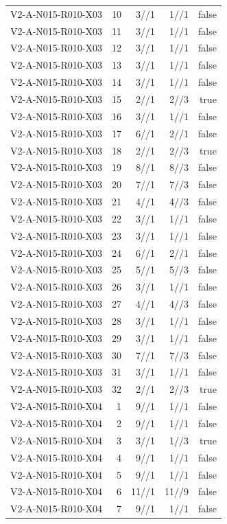 {\begin{longtable}{lrrrr}
V2-A-N015-R010-X03 & 10 & 3//1 & 1//1 & false \\
V2-A-N015-R010-X03 & 11 & 3//1 & 1//1 & false \\
V2-A-N015-R010-X03 & 12 & 3//1 & 1//1 & false \\
V2-A-N015-R010-X03 & 13 & 3//1 & 1//1 & false \\
V2-A-N015-R010-X03 & 14 & 3//1 & 1//1 & false \\
V2-A-N015-R010-X03 & 15 & 2//1 & 2//3 & true \\
V2-A-N015-R010-X03 & 16 & 3//1 & 1//1 & false \\
V2-A-N015-R010-X03 & 17 & 6//1 & 2//1 & false \\
V2-A-N015-R010-X03 & 18 & 2//1 & 2//3 & true \\
V2-A-N015-R010-X03 & 19 & 8//1 & 8//3 & false \\
V2-A-N015-R010-X03 & 20 & 7//1 & 7//3 & false \\
V2-A-N015-R010-X03 & 21 & 4//1 & 4//3 & false \\
V2-A-N015-R010-X03 & 22 & 3//1 & 1//1 & false \\
V2-A-N015-R010-X03 & 23 & 3//1 & 1//1 & false \\
V2-A-N015-R010-X03 & 24 & 6//1 & 2//1 & false \\
V2-A-N015-R010-X03 & 25 & 5//1 & 5//3 & false \\
V2-A-N015-R010-X03 & 26 & 3//1 & 1//1 & false \\
V2-A-N015-R010-X03 & 27 & 4//1 & 4//3 & false \\
V2-A-N015-R010-X03 & 28 & 3//1 & 1//1 & false \\
V2-A-N015-R010-X03 & 29 & 3//1 & 1//1 & false \\
V2-A-N015-R010-X03 & 30 & 7//1 & 7//3 & false \\
V2-A-N015-R010-X03 & 31 & 3//1 & 1//1 & false \\
V2-A-N015-R010-X03 & 32 & 2//1 & 2//3 & true \\
V2-A-N015-R010-X04 & 1 & 9//1 & 1//1 & false \\
V2-A-N015-R010-X04 & 2 & 9//1 & 1//1 & false \\
V2-A-N015-R010-X04 & 3 & 3//1 & 1//3 & true \\
V2-A-N015-R010-X04 & 4 & 9//1 & 1//1 & false \\
V2-A-N015-R010-X04 & 5 & 9//1 & 1//1 & false \\
V2-A-N015-R010-X04 & 6 & 11//1 & 11//9 & false \\
V2-A-N015-R010-X04 & 7 & 9//1 & 1//1 & false \\

\end{longtable}}
